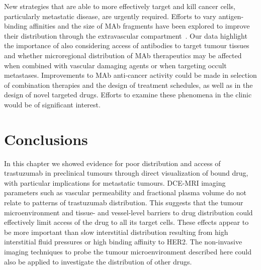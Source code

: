 
New strategies that are able to more effectively target and kill cancer cells, particularly metastatic disease, are urgently required.
Efforts to vary antigen-binding affinities and the size of \acs{MAb} fragments have been explored to improve their distribution through the extravascular compartment~\cite{Jain:2010ie,Chauhan:2011fi}.
Our data highlight the importance of also considering access of antibodies to target tumour tissues and whether microregional distribution of \acs{MAb} therapeutics may be affected when combined with vascular damaging agents or when targeting occult metastases.
Improvements to \acs{MAb} anti-cancer activity could be made in selection of combination therapies and the design of treatment schedules, as well as in the design of novel targeted drugs.
Efforts to examine these phenomena in the clinic would be of significant interest.

\section{Conclusions}
In this chapter we showed evidence for poor distribution and access of trastuzumab in preclinical tumours through direct visualization of bound drug, with particular implications for metastatic tumours.
\acs{DCE-MRI} imaging parameters such as vascular permeability and fractional plasma volume do not relate to patterns of trastuzumab distribution.
\sloppy
This suggests that the tumour microenvironment and tissue- and vessel-level barriers to drug distribution could effectively limit access of the drug to all its target cells.
These effects appear to be more important than slow interstitial distribution resulting from high interstitial fluid pressures or high binding affinity to \acs{HER2}.
The non-invasive imaging techniques to probe the tumour microenvironment described here could also be applied to investigate the distribution of other drugs.

\endinput